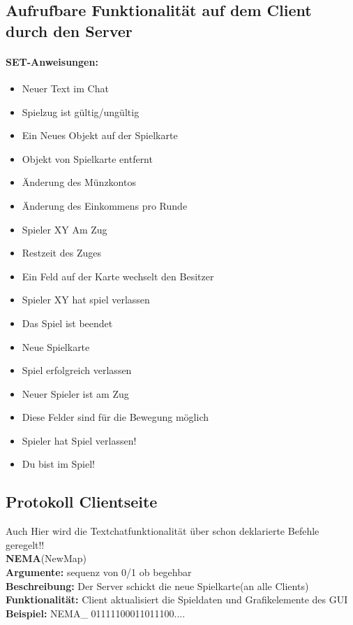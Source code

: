 \documentclass[a4paper, 12pt, oneside, headsepline=.5pt,footsepline=.5pt]{scrartcl}
\begin{document}
\subsection{Aufrufbare Funktionalität auf dem Client durch den Server}
\paragraph{\textbf SET-Anweisungen:}
\begin{itemize}
\item Neuer Text im Chat
\item Spielzug ist gültig/ungültig
\item Ein Neues Objekt auf der Spielkarte
\item Objekt von Spielkarte entfernt
\item Änderung des Münzkontos
\item Änderung des Einkommens pro Runde
\item Spieler XY Am Zug
\item Restzeit des Zuges
\item Ein Feld auf der Karte wechselt den Besitzer
\item Spieler XY hat spiel verlassen
\item Das Spiel ist beendet
\item Neue Spielkarte
\item Spiel erfolgreich verlassen
\item Neuer Spieler ist am Zug
\item Diese Felder sind für die Bewegung möglich
\item Spieler hat Spiel verlassen!
\item Du bist im Spiel!
\end{itemize}


\subsection{Protokoll Clientseite}

Auch Hier wird die Textchatfunktionalität über schon deklarierte Befehle geregelt!! \\

{\large \textbf{NEMA}(NewMap)} \\
\hspace{4ex} \textbf{Argumente:} {sequenz von 0/1 ob begehbar} \\
\hspace{4ex} \textbf{Beschreibung:} {Der Server schickt die neue Spielkarte(an alle Clients)} \\
\hspace{4ex} \textbf{Funktionalität:} {Client aktualisiert die Spieldaten und Grafikelemente des GUI} \\
\hspace{4ex} \textbf{Beispiel:} {NEMA\_ 01111100011011100....} \\
\end{document}
